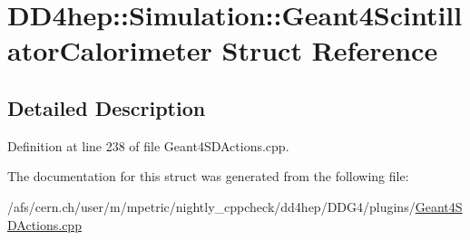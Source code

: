 \hypertarget{struct_d_d4hep_1_1_simulation_1_1_geant4_scintillator_calorimeter}{}\section{D\+D4hep\+:\+:Simulation\+:\+:Geant4\+Scintillator\+Calorimeter Struct Reference}
\label{struct_d_d4hep_1_1_simulation_1_1_geant4_scintillator_calorimeter}


\subsection{Detailed Description}


Definition at line 238 of file Geant4\+S\+D\+Actions.\+cpp.



The documentation for this struct was generated from the following file\+:\begin{DoxyCompactItemize}
\item 
/afs/cern.\+ch/user/m/mpetric/nightly\+\_\+cppcheck/dd4hep/\+D\+D\+G4/plugins/\hyperlink{_geant4_s_d_actions_8cpp}{Geant4\+S\+D\+Actions.\+cpp}\end{DoxyCompactItemize}
